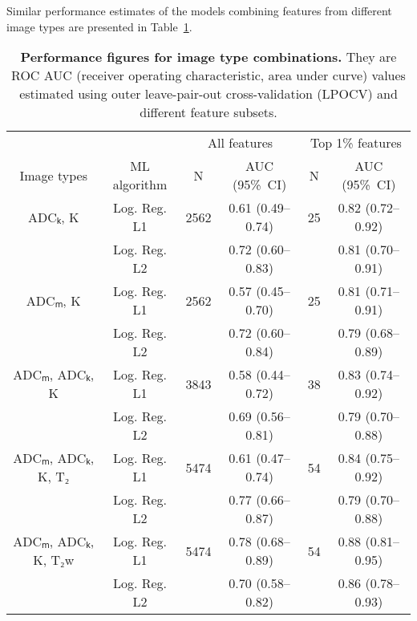\documentclass[10pt,letterpaper]{article}
\newcommand{\ci}[1]{{\small (#1)}}  %
\begin{document}
Similar performance estimates of the models combining features from different
image types are presented in Table~\ref{tab:auc_combinations}.

\begin{table}[!h]
\begin{adjustwidth}{-2.25in}{0in}
\centering
\caption{{\bf Performance figures for image type combinations.} They are ROC AUC
(receiver operating characteristic, area under curve) values estimated using
outer leave-pair-out cross-validation (LPOCV) and different feature subsets.}%
\label{tab:auc_combinations}

\begin{tabular}{c c  c c  c c}
\hline
& & \multicolumn{2}{c}{All features} & \multicolumn{2}{c}{Top 1\% features} \\
Image types & ML algorithm & N & AUC \ci{95\%~CI} & N & AUC \ci{95\%~CI} \\
\hline
ADCₖ, K                & Log. Reg. L1 & 2562 & 0.61 \ci{0.49--0.74} & 25 & 0.82 \ci{0.72--0.92} \\
                       & Log. Reg. L2 &      & 0.72 \ci{0.60--0.83} &    & 0.81 \ci{0.70--0.91} \\
ADCₘ, K                & Log. Reg. L1 & 2562 & 0.57 \ci{0.45--0.70} & 25 & 0.81 \ci{0.71--0.91} \\
                       & Log. Reg. L2 &      & 0.72 \ci{0.60--0.84} &    & 0.79 \ci{0.68--0.89} \\
ADCₘ, ADCₖ, K          & Log. Reg. L1 & 3843 & 0.58 \ci{0.44--0.72} & 38 & 0.83 \ci{0.74--0.92} \\
                       & Log. Reg. L2 &      & 0.69 \ci{0.56--0.81} &    & 0.79 \ci{0.70--0.88} \\
ADCₘ, ADCₖ, K, T₂      & Log. Reg. L1 & 5474 & 0.61 \ci{0.47--0.74} & 54 & 0.84 \ci{0.75--0.92} \\
                       & Log. Reg. L2 &      & 0.77 \ci{0.66--0.87} &    & 0.79 \ci{0.70--0.88} \\
ADCₘ, ADCₖ, K, T₂w     & Log. Reg. L1 & 5474 & 0.78 \ci{0.68--0.89} & 54 & 0.88 \ci{0.81--0.95} \\
                       & Log. Reg. L2 &      & 0.70 \ci{0.58--0.82} &    & 0.86 \ci{0.78--0.93} \\

\end{tabular}
\end{adjustwidth}
\end{table}
\end{document}
